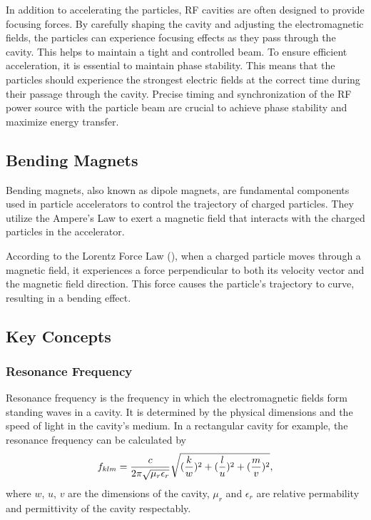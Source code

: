 \documentclass[a4paper,oneside,12pt]{report}
\numberwithin{equation}{chapter}
\begin{document}
In addition to accelerating the particles, RF cavities are often designed to provide focusing forces. 
By carefully shaping the cavity and adjusting the electromagnetic fields, the particles can experience focusing effects as they pass through the cavity. 
This helps to maintain a tight and controlled beam. To ensure efficient acceleration, it is essential to maintain phase stability. 
This means that the particles should experience the strongest electric fields at the correct time during their passage through the cavity. 
Precise timing and synchronization of the RF power source with the particle beam are crucial to achieve phase stability and maximize energy transfer.

\subsection{Bending Magnets}
Bending magnets, also known as dipole magnets, are fundamental components used in particle accelerators to control the trajectory of charged particles. 
They utilize the Ampere's Law to exert a magnetic field that interacts with the charged particles in the accelerator. 

According to the Lorentz Force Law (), when a charged particle moves through a magnetic field, it experiences a force perpendicular to both its velocity 
vector and the magnetic field direction. This force causes the particle's trajectory to curve, resulting in a bending effect.


\subsection{Key Concepts}

\subsubsection{Resonance Frequency}
Resonance frequency is the frequency in which the electromagnetic fields form standing waves in a cavity.
It is determined by the physical dimensions and the speed of light in the cavity's medium. 
In a rectangular cavity for example, the resonance frequency can be calculated by
\vspace{-10pt}\begin{equation}
    f_{klm} = \frac{c}{2\pi \sqrt{\mu_r \epsilon_r}} \sqrt{(\frac{k}{w})^2 + (\frac{l}{u})^2 + (\frac{m}{v})^2}  ,
    \label{eq:f_r_rec}
\vspace{-10pt}\end{equation}
where $w$, $u$, $v$ are the dimensions of the cavity, $\mu_r$ and $\epsilon_r$ are relative permability and permittivity of the cavity respectably.
\end{document}
